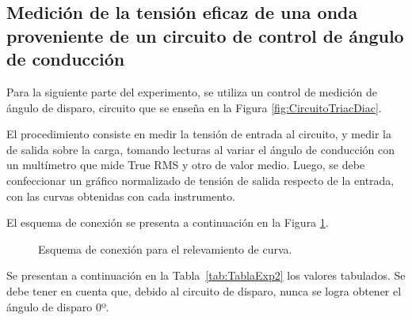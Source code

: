   \subsection{Medición de la tensión eficaz de una onda proveniente de un circuito de control de ángulo de conducción}
Para la siguiente parte del experimento, se utiliza un control de medición 
de ángulo de disparo, circuito que se enseña en la Figura \ref{fig:CircuitoTriacDiac}.



El procedimiento consiste en medir la tensión de entrada al circuito, 
y medir la de salida sobre la carga, tomando lecturas
al variar el ángulo de conducción con un multímetro que mide True RMS y otro de valor medio. 
Luego, se debe confeccionar un gráfico normalizado de tensión de salida 
respecto de la entrada, con las curvas obtenidas con cada instrumento.

El esquema de conexión se presenta a continuación en la Figura \ref{fig:EsquemaConexionTriac}.

\begin{figure}[H]
  \centering
  \caption{Esquema de conexión para el relevamiento de curva.}
  \label{fig:EsquemaConexionTriac}
\end{figure}

Se presentan a continuación en la Tabla~\ref{tab:TablaExp2} los valores tabulados. Se debe tener en cuenta que, debido al circuito de disparo, nunca se logra obtener el ángulo de disparo 0º.

